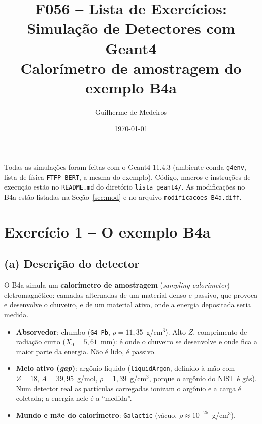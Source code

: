 \documentclass[a4paper,11pt]{article}
\title{F056 -- Lista de Exercícios: Simulação de Detectores com Geant4\\
\large Calorímetro de amostragem do exemplo B4a}
\author{Guilherme de Medeiros}
\date{\today}
\begin{document}
\maketitle

\noindent Todas as simulações foram feitas com o Geant4 11.4.3 (ambiente conda \texttt{g4env},
lista de física \texttt{FTFP\_BERT}, a mesma do exemplo). Código, macros e instruções de execução
estão no \texttt{README.md} do diretório \texttt{lista\_geant4/}. As modificações no B4a estão
listadas na Seção~\ref{sec:mod} e no arquivo \texttt{modificacoes\_B4a.diff}.

\section{Exercício 1 -- O exemplo B4a}

\subsection{(a) Descrição do detector}

O B4a simula um \textbf{calorímetro de amostragem} (\emph{sampling calorimeter}) eletromagnético:
camadas alternadas de um material denso e passivo, que provoca e desenvolve o chuveiro, e de um
material ativo, onde a energia depositada seria medida.

\begin{itemize}
  \item \textbf{Absorvedor}: chumbo (\texttt{G4\_Pb}, $\rho = 11{,}35$~g/cm$^3$). Alto $Z$, comprimento de radiação
    curto ($X_0 = 5{,}61$~mm): é onde o chuveiro se desenvolve e onde fica a maior parte da energia.
    Não é lido, é passivo.
  \item \textbf{Meio ativo (\emph{gap})}: argônio líquido (\texttt{liquidArgon}, definido à mão com
    $Z=18$, $A = 39{,}95$~g/mol, $\rho = 1{,}39$~g/cm$^3$, porque o argônio do NIST é gás). Num detector
    real as partículas carregadas ionizam o argônio e a carga é coletada; a energia nele é a ``medida''.
  \item \textbf{Mundo e mãe do calorímetro}: \texttt{Galactic} (vácuo, $\rho \approx 10^{-25}$~g/cm$^3$).
\end{itemize}
\end{document}
